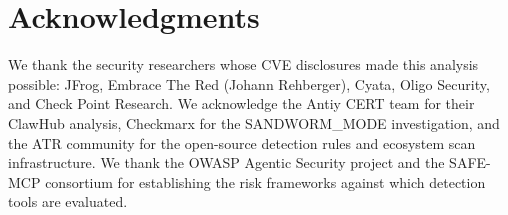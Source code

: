 \documentclass[11pt,twocolumn]{article}
\begin{document}
\section*{Acknowledgments}

We thank the security researchers whose CVE disclosures made this analysis possible: JFrog, Embrace The Red (Johann Rehberger), Cyata, Oligo Security, and Check Point Research. We acknowledge the Antiy CERT team for their ClawHub analysis, Checkmarx for the SANDWORM\_MODE investigation, and the ATR community for the open-source detection rules and ecosystem scan infrastructure. We thank the OWASP Agentic Security project and the SAFE-MCP consortium for establishing the risk frameworks against which detection tools are evaluated.
\end{document}
